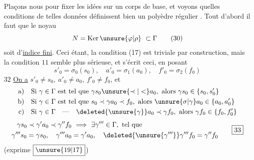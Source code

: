 Plaçons nous pour fixer les idées sur un corps de base, et voyons  quelles conditions de telles données définissent bien un polyèdre régulier . Tout d'abord il faut que le noyau
\[
 N=\mathrm{Ker}\,\unsure{\varphi|\rho}\ \subset\Gamma\tag*{(30)}
\]
soit d'\uline{indice fini}. Ceci étant, la condition  (17) est triviale par construction, mais la condition $\boxed{11}$ semble plus sérieuse, et s'écrit ceci, en posant
\[
 s'_0=\sigma_0(s_0),\quad a'_0=\sigma_1(a_0),\quad f'_0=\sigma_2(f_0)\tag*{(31)}
\]
$\boxed{32}$ \uline{On a} $s'_0\ne s_0,\ a'_0\ne a_0,\ f'_0\ne f_0$, et
\[
 \begin{aligned}
 \text{a)}\quad&\text{Si }\gamma\in\Gamma\text{ est tel que }\gamma s_0\unsure{\prec|<}a_0,\ \text{alors }\gamma s_0\in\{s_0,s'_0\}\\
 \text{b)}\quad&\text{Si }\gamma\in\Gamma\text{ est tel que }s_0\prec\gamma a_0\prec f_0,\ \text{alors }\unsure{\sigma|\gamma}a_0\in\{a_0,a'_0\}\\
 \text{c)}\quad&\text{Si }\gamma\in\Gamma\quad\text{---}\quad\deleted{\unsure{\gamma}}a_0\prec\gamma f_0,\ \text{alors }\gamma f_0\in\{f_0,f'_0\}
 \end{aligned}
\]
\[
 \begin{aligned}
 \gamma s_0\prec\gamma'a_0\prec\gamma''f_0&\ \Longrightarrow\ \exists\gamma'''\in\Gamma,\ \text{tel que}\\
 \gamma'''s_0=\gamma s_0,\quad\gamma'''a_0&=\gamma'a_0,\quad\deleted{\unsure{\gamma'''}}\gamma'''f_0=\gamma''f_0
 \end{aligned}\tag*{\boxed{33}}
\]
(exprime $\boxed{\unsure{19|17}}$)

